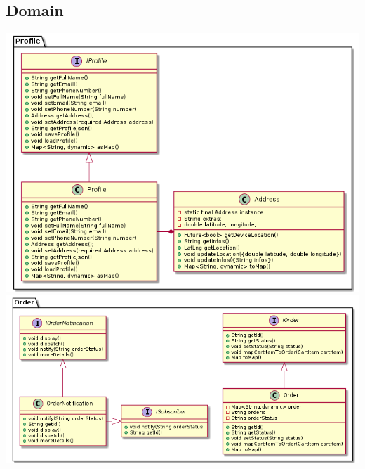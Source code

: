 \documentclass{article}
\begin{document}
\subsection{Domain}
\includegraphics[scale=0.5]{./out/MobileApp/Domain/Profile/Profile.png}
\includegraphics[scale=0.5]{./out/MobileApp/Domain/Order/Order.png}
\end{document}
